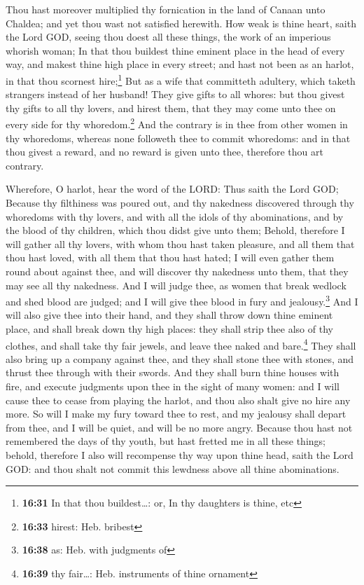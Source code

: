 Thou hast moreover multiplied thy fornication in the land of Canaan unto
Chaldea; and yet thou wast not satisfied herewith.  How
weak is thine heart, saith the Lord GOD, seeing thou doest all these
things, the work of an imperious whorish woman;  In that
thou buildest thine eminent place in the head of every way, and makest
thine high place in every street; and hast not been as an harlot, in
that thou scornest hire;\footnote{\textbf{16:31} In that thou
  buildest\ldots: or, In thy daughters is thine, etc} 
But as a wife that committeth adultery, which taketh strangers instead
of her husband!  They give gifts to all whores: but thou
givest thy gifts to all thy lovers, and hirest them, that they may come
unto thee on every side for thy whoredom.\footnote{\textbf{16:33}
  hirest: Heb. bribest}  And the contrary is in thee from
other women in thy whoredoms, whereas none followeth thee to commit
whoredoms: and in that thou givest a reward, and no reward is given unto
thee, therefore thou art contrary.

 Wherefore, O harlot, hear the word of the LORD:
 Thus saith the Lord GOD; Because thy filthiness was
poured out, and thy nakedness discovered through thy whoredoms with thy
lovers, and with all the idols of thy abominations, and by the blood of
thy children, which thou didst give unto them;  Behold,
therefore I will gather all thy lovers, with whom thou hast taken
pleasure, and all them that thou hast loved, with all them that thou
hast hated; I will even gather them round about against thee, and will
discover thy nakedness unto them, that they may see all thy nakedness.
 And I will judge thee, as women that break wedlock and
shed blood are judged; and I will give thee blood in fury and
jealousy.\footnote{\textbf{16:38} as: Heb. with judgments of}
 And I will also give thee into their hand, and they
shall throw down thine eminent place, and shall break down thy high
places: they shall strip thee also of thy clothes, and shall take thy
fair jewels, and leave thee naked and bare.\footnote{\textbf{16:39} thy
  fair\ldots: Heb. instruments of thine ornament}  They
shall also bring up a company against thee, and they shall stone thee
with stones, and thrust thee through with their swords. 
And they shall burn thine houses with fire, and execute judgments upon
thee in the sight of many women: and I will cause thee to cease from
playing the harlot, and thou also shalt give no hire any more.
 So will I make my fury toward thee to rest, and my
jealousy shall depart from thee, and I will be quiet, and will be no
more angry.  Because thou hast not remembered the days of
thy youth, but hast fretted me in all these things; behold, therefore I
also will recompense thy way upon thine head, saith the Lord GOD: and
thou shalt not commit this lewdness above all thine abominations.

